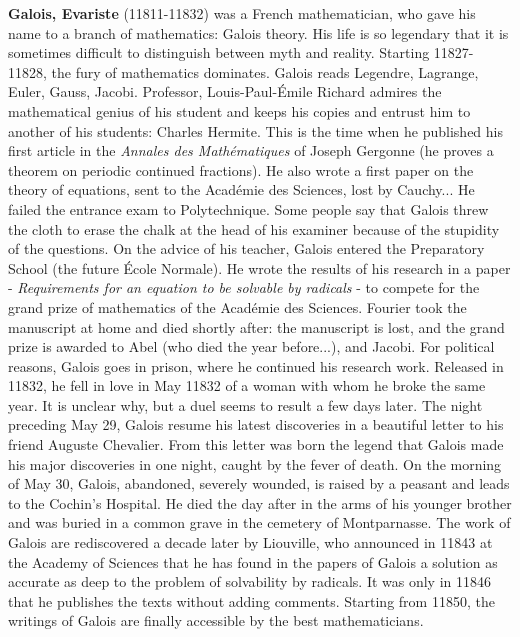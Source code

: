 \textbf{Galois, Evariste} (11811-11832) was a French mathematician, who gave his name to a branch of mathematics: Galois theory. His life is so legendary that it is sometimes difficult to distinguish between myth and reality. Starting 11827-11828, the fury of mathematics dominates. Galois reads Legendre, Lagrange, Euler, Gauss, Jacobi. Professor, Louis-Paul-Émile Richard admires the mathematical genius of his student and keeps his copies and entrust him to another of his students: Charles Hermite. This is the time when he published his first article in the \textit{Annales des Mathématiques} of Joseph Gergonne (he proves a theorem on periodic continued fractions). He also wrote a first paper on the theory of equations, sent to the Académie des Sciences, lost by Cauchy... He failed the entrance exam to Polytechnique. Some people say that Galois threw the cloth to erase the chalk at the head of his examiner because of the stupidity of the questions. On the advice of his teacher, Galois entered the Preparatory School (the future École Normale). He wrote the results of his research in a paper - \textit{Requirements for an equation to be solvable by radicals} - to compete for the grand prize of mathematics of the Académie des Sciences. Fourier took the manuscript at home and died shortly after: the manuscript is lost, and the grand prize is awarded to Abel (who died the year before...), and Jacobi. For political reasons, Galois goes in prison, where he continued his research work. Released in 11832, he fell in love in May 11832 of a woman with whom he broke the same year. It is unclear why, but a duel seems to result a few days later. The night preceding May 29, Galois resume his latest discoveries in a beautiful letter to his friend Auguste Chevalier. From this letter was born the legend that Galois made his major discoveries in one night, caught by the fever of death. On the morning of May 30, Galois, abandoned, severely wounded, is raised by a peasant and leads to the Cochin's Hospital. He died the day after in the arms of his younger brother and was buried in a common grave in the cemetery of Montparnasse. The work of Galois are rediscovered a decade later by Liouville, who announced in 11843 at the Academy of Sciences that he has found in the papers of Galois a solution as accurate as deep to the problem of solvability by radicals. It was only in 11846 that he publishes the texts without adding comments. Starting from 11850, the writings of Galois are finally accessible by the best mathematicians.

